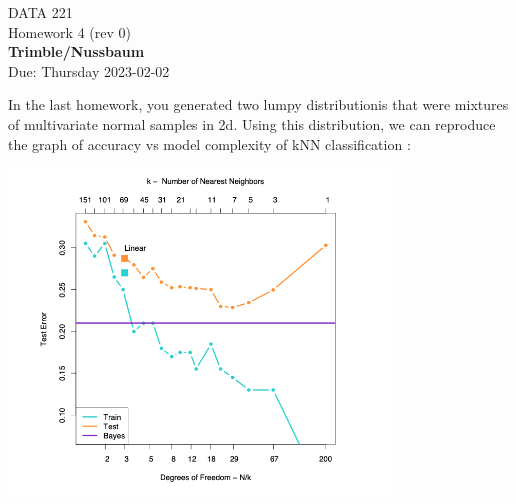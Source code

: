 \documentclass[12pt]{book}
\theoremstyle{definition}
\begin{document}
\begin{center}
{\Large DATA 221 \\  Homework 4  (rev 0)}\\
\textbf{Trimble/Nussbaum}\\ %
Due: Thursday 2023-02-02 
\end{center}

\vspace{0.2 cm}
In the last homework, you generated two lumpy distributionis that were mixtures of multivariate normal samples in 2d.
Using this distribution, we can reproduce the graph of accuracy vs model complexity of kNN classification :

\includegraphics[width=4in]{src/hastie-generalization.png}
\end{document}
